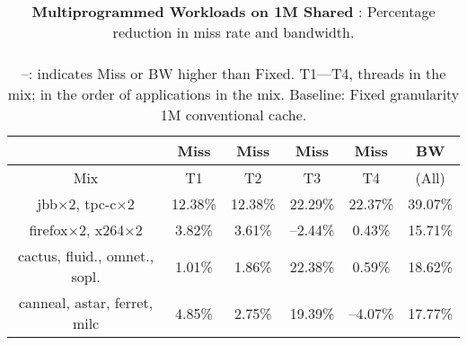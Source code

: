 \begin{table}[!h]
  \vspace{10pt}
  \centering
  \begin{tabular}{|c|c|c|c|c|c|} 
      \hline
      & Miss  & Miss  & Miss  & Miss & BW \\
      \hline
      Mix & T1 & T2 & T3 & T4 & (All)\\
      \hline
      jbb$\times$2, tpc-c$\times$2 & 12.38\% & 12.38\% & 22.29\% &22.37\% & 39.07\% \\
      \hline
      firefox$\times$2, x264$\times$2 & 3.82\% & 3.61\% & --2.44\% & 0.43\% & 15.71\%\\
      \hline
      cactus, fluid., omnet., sopl. & 1.01\% & 1.86\% & 22.38\% & 0.59\% & 18.62\% \\
      \hline
      canneal, astar, ferret, milc & 4.85\% & 2.75\% & 19.39\% & --4.07\% & 17.77\%\\
      \hline
  \end{tabular}
  \caption[Multiprogrammed workloads on \AC{}]{\textbf{Multiprogrammed Workloads on 1M Shared \AC{}}: Percentage reduction in miss rate and bandwidth. \\ \\  
  --: indicates Miss or BW higher than Fixed. T1---T4, threads in the mix; in the order of applications in the mix. Baseline: Fixed granularity 1M conventional cache.}
  \label{table:multiprogrammed} 
\end{table}
